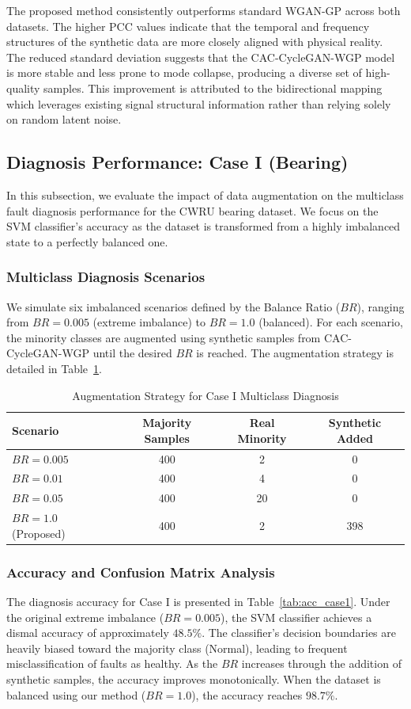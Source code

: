The proposed method consistently outperforms standard WGAN-GP across both datasets. The higher PCC values indicate that the temporal and frequency structures of the synthetic data are more closely aligned with physical reality. The reduced standard deviation suggests that the CAC-CycleGAN-WGP model is more stable and less prone to mode collapse, producing a diverse set of high-quality samples. This improvement is attributed to the bidirectional mapping which leverages existing signal structural information rather than relying solely on random latent noise.

\subsection{Diagnosis Performance: Case I (Bearing)}
In this subsection, we evaluate the impact of data augmentation on the multiclass fault diagnosis performance for the CWRU bearing dataset. We focus on the SVM classifier's accuracy as the dataset is transformed from a highly imbalanced state to a perfectly balanced one.

\subsubsection{Multiclass Diagnosis Scenarios}
We simulate six imbalanced scenarios defined by the Balance Ratio ($BR$), ranging from $BR=0.005$ (extreme imbalance) to $BR=1.0$ (balanced). For each scenario, the minority classes are augmented using synthetic samples from CAC-CycleGAN-WGP until the desired $BR$ is reached. The augmentation strategy is detailed in Table~\ref{tab:aug_case1}.

\begin{table}[htbp]
\centering
\caption{Augmentation Strategy for Case I Multiclass Diagnosis}
\label{tab:aug_case1}
\begin{tabular}{lccc}
\hline
\textbf{Scenario} & \textbf{Majority Samples} & \textbf{Real Minority} & \textbf{Synthetic Added} \\ \hline
$BR = 0.005$ & 400 & 2 & 0 \\
$BR = 0.01$  & 400 & 4 & 0 \\
$BR = 0.05$  & 400 & 20 & 0 \\
$BR = 1.0$ (Proposed) & 400 & 2 & 398 \\
\hline
\end{tabular}
\end{table}

\subsubsection{Accuracy and Confusion Matrix Analysis}
The diagnosis accuracy for Case I is presented in Table~\ref{tab:acc_case1}. Under the original extreme imbalance ($BR=0.005$), the SVM classifier achieves a dismal accuracy of approximately $48.5\%$. The classifier's decision boundaries are heavily biased toward the majority class (Normal), leading to frequent misclassification of faults as healthy. As the $BR$ increases through the addition of synthetic samples, the accuracy improves monotonically. When the dataset is balanced using our method ($BR=1.0$), the accuracy reaches $98.7\%$.


